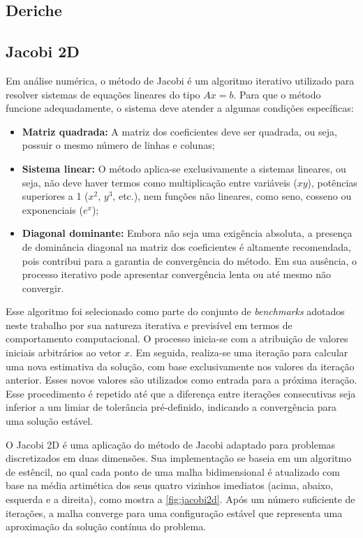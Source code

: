 \subsection{Deriche}\label{subsec:deriche}

\subsection{Jacobi 2D}\label{subsec:jacobi2d}

Em análise numérica, o método de Jacobi é um algoritmo iterativo utilizado para resolver sistemas de equações lineares do tipo $Ax = b$. Para que o método funcione adequadamente, o sistema deve atender a algumas condições específicas:

\begin{itemize}
	\item \textbf{Matriz quadrada:} A matriz dos coeficientes deve ser quadrada, ou seja, possuir o mesmo número de linhas e colunas;
	\item \textbf{Sistema linear:} O método aplica-se exclusivamente a sistemas lineares, ou seja, não deve haver termos como multiplicação entre variáveis ($xy$), potências superiores a 1 ($x^2$, $y^3$, etc.), nem funções não lineares, como seno, cosseno ou exponenciais ($e^x$);
	\item \textbf{Diagonal dominante:} Embora não seja uma exigência absoluta, a presença de dominância diagonal na matriz dos coeficientes é altamente recomendada, pois contribui para a garantia de convergência do método. Em sua ausência, o processo iterativo pode apresentar convergência lenta ou até mesmo não convergir.
\end{itemize}

Esse algoritmo foi selecionado como parte do conjunto de \textit{benchmarks} adotados neste trabalho por sua natureza iterativa e previsível em termos de comportamento computacional. O processo inicia-se com a atribuição de valores iniciais arbitrários ao vetor $x$. Em seguida, realiza-se uma iteração para calcular uma nova estimativa da solução, com base exclusivamente nos valores da iteração anterior. Esses novos valores são utilizados como entrada para a próxima iteração. Esse procedimento é repetido até que a diferença entre iterações consecutivas seja inferior a um limiar de tolerância pré-definido, indicando a convergência para uma solução estável.

O Jacobi 2D é uma aplicação do método de Jacobi adaptado para problemas discretizados em duas dimensões. Sua implementação se baseia em um algoritmo de estêncil, no qual cada ponto de uma malha bidimensional é atualizado com base na média artimética dos seus quatro vizinhos imediatos (acima, abaixo, esquerda e a direita), como mostra a \autoref{fig:jacobi2d}. Após um número suficiente de iterações, a malha converge para uma configuração estável que representa uma aproximação da solução contínua do problema.

